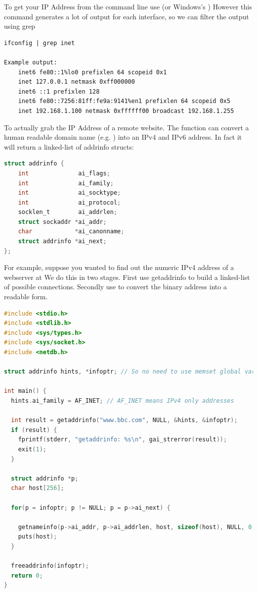 To get your IP Address from the command line use  (or Windows's ) However this command generates a lot of output for each interface, so we can filter the output using grep

\begin{lstlisting}
ifconfig | grep inet

Example output:
    inet6 fe80::1%lo0 prefixlen 64 scopeid 0x1 
    inet 127.0.0.1 netmask 0xff000000 
    inet6 ::1 prefixlen 128 
    inet6 fe80::7256:81ff:fe9a:9141%en1 prefixlen 64 scopeid 0x5 
    inet 192.168.1.100 netmask 0xffffff00 broadcast 192.168.1.255
\end{lstlisting}

To actually grab the IP Address of a remote website. The function  can convert a human readable domain name (e.g.
) into an IPv4 and IPv6 address.
In fact it will return a linked-list of addrinfo structs:

\begin{lstlisting}[language=C]
struct addrinfo {
    int              ai_flags;
    int              ai_family;
    int              ai_socktype;
    int              ai_protocol;
    socklen_t        ai_addrlen;
    struct sockaddr *ai_addr;
    char            *ai_canonname;
    struct addrinfo *ai_next;
};
\end{lstlisting}

For example, suppose you wanted to find out the numeric IPv4 address of a webserver at 
We do this in two stages.
First use getaddrinfo to build a linked-list of possible connections.
Secondly use  to convert the binary address into a readable form.

\begin{lstlisting}[language=C]
#include <stdio.h>
#include <stdlib.h>
#include <sys/types.h>
#include <sys/socket.h>
#include <netdb.h>

struct addrinfo hints, *infoptr; // So no need to use memset global variables

int main() {
  hints.ai_family = AF_INET; // AF_INET means IPv4 only addresses

  int result = getaddrinfo("www.bbc.com", NULL, &hints, &infoptr);
  if (result) {
    fprintf(stderr, "getaddrinfo: %s\n", gai_strerror(result));
    exit(1);
  }

  struct addrinfo *p;
  char host[256];

  for(p = infoptr; p != NULL; p = p->ai_next) {

    getnameinfo(p->ai_addr, p->ai_addrlen, host, sizeof(host), NULL, 0, NI_NUMERICHOST);
    puts(host);
  }

  freeaddrinfo(infoptr);
  return 0;
}
\end{lstlisting}

